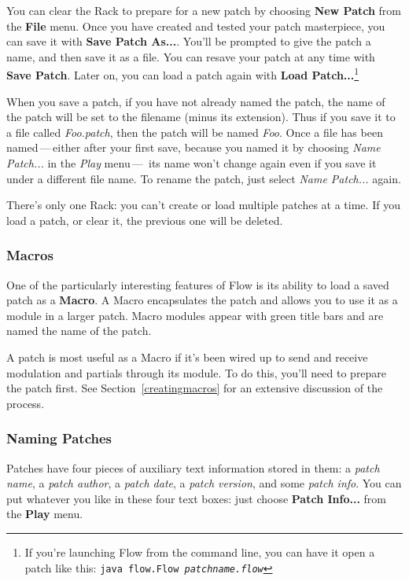 \documentclass{article}
\newcommand\name{Flow}
\begin{document}
You can clear the Rack to prepare for a new patch by choosing {\bf New Patch} from the {\bf File} menu.  Once you have created and tested your patch masterpiece, you can save it with {\bf Save Patch As...}.  You'll be prompted to give the patch a name, and then save it as a file.   You can resave your patch at any time with {\bf Save Patch}.  Later on, you can load a patch again with {\bf Load Patch...}\footnote{If you're launching Flow from the command line, you can have it open a patch like this:\hspace{\fill} {\tt java flow.Flow \textit{patchname.flow}}}

When you save a patch, if you have not already named the patch, the name of the patch will be set to the filename (minus its extension).  Thus if you save it to a file called {\it Foo.patch}, then the patch will be named {\it Foo}.  Once a file has been named\,---\,either after your first save, because you named it by choosing {\it Name Patch...} in the {\it Play} menu\,---\, its name won't change again even if you save it under a different file name.  To rename the patch, just select {\it Name Patch...} again.

There's only one Rack: you can't create or load multiple patches at a time.  If you load a patch, or clear it, the previous one will be deleted.

\subsubsection{Macros}
\label{aboutmacros}

One of the particularly interesting features of {\name} is its ability to load a saved patch as a {\bf Macro}.  A Macro encapsulates the patch and allows you to use it as a module in a larger patch.  Macro modules appear with green title bars and are named the name of the patch.

A patch is most useful as a Macro if it's been wired up to send and receive modulation and partials through its module.  To do this, you'll need to prepare the patch first.  See Section~\ref{creatingmacros} for an extensive discussion of the process.

\subsubsection{Naming Patches}

Patches have four pieces of auxiliary text information stored in them: a {\it patch name}, a {\it patch author}, a {\it patch date}, a {\it patch version}, and some {\it patch info}.  You can put whatever you like in these four text boxes: just choose {\bf Patch Info...} from the {\bf Play} menu.
\end{document}
